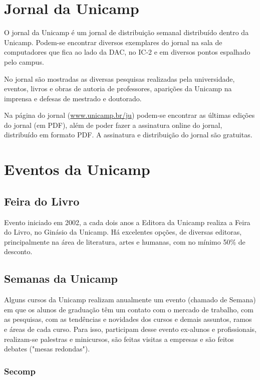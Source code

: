 
\section{Jornal da Unicamp}

O jornal da Unicamp é um jornal de distribuição semanal distribuído dentro da
Unicamp. Podem-se encontrar diversos exemplares do jornal na sala de computadores
que fica ao lado da DAC, no IC-2 e em diversos pontos espalhado pelo campus.

No jornal são mostradas as diversas pesquisas realizadas pela universidade,
eventos, livros e obras de autoria de professores, aparições da Unicamp na
imprensa e defesas de mestrado e doutorado.

Na página do jornal (\url{www.unicamp.br/ju}) podem-se encontrar as
últimas edições do jornal (em PDF), além de poder fazer a assinatura online do
jornal, distribuído em formato PDF. A assinatura e distribuição do jornal são
gratuitas.

\section{Eventos da Unicamp}
\subsection{Feira do Livro}

Evento iniciado em 2002, a cada dois anos a Editora da Unicamp realiza a Feira
do Livro, no Ginásio da Unicamp. Há excelentes opções, de diversas editoras,
principalmente na área de literatura, artes e humanas, com no mínimo 50\% de
desconto.

\subsection{Semanas da Unicamp}

Alguns cursos da Unicamp realizam anualmente um evento (chamado de Semana) em
que os alunos de graduação têm um contato com o mercado de trabalho, com as
pesquisas, com as tendências e novidades dos cursos e demais assuntos, ramos
e áreas de cada curso. Para isso, participam desse evento ex-alunos
e profissionais, realizam-se palestras e minicursos, são feitas visitas
a empresas e são feitos debates ("mesas redondas").

\subsubsection{Secomp}

